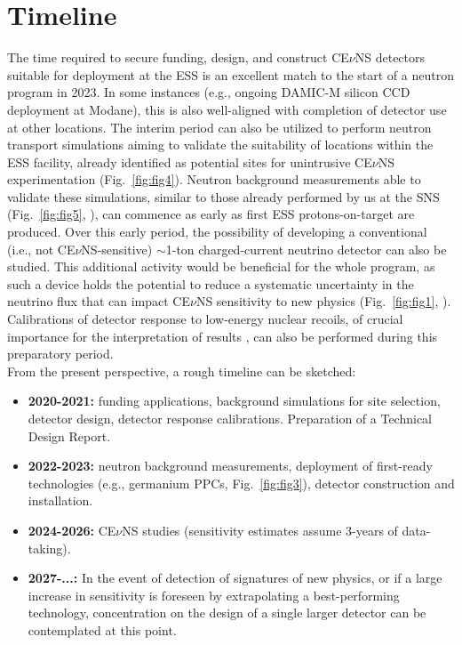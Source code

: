 \documentclass[12pt]{article}
\begin{document}
\newpage

\section{Timeline}

The time required to secure funding, design, and construct CE$\nu$NS detectors suitable for deployment at the ESS is an excellent match to the start of a neutron program in 2023. In some instances (e.g., ongoing DAMIC-M silicon CCD deployment at Modane), this is also well-aligned with  completion of detector use at other locations. The interim period can also be  utilized to perform neutron transport simulations aiming to validate the suitability of locations within the ESS facility,  already identified as potential  sites for unintrusive CE$\nu$NS experimentation (Fig.\ \ref{fig:fig4}). Neutron background measurements able to validate these simulations, similar to those already performed by us at the SNS (Fig.\ \ref{fig:fig5}, \cite{science,bjorn}), can commence as early as first ESS protons-on-target are produced. Over this early period, the possibility  of developing a conventional (i.e., not CE$\nu$NS-sensitive) $\sim$1-ton charged-current neutrino detector \cite{d2o} can also be studied. This additional activity would be beneficial for the whole program, as such a device  holds the potential to reduce a systematic uncertainty in the neutrino flux that can impact CE$\nu$NS sensitivity to new physics (Fig.\ \ref{fig:fig1}, \cite{ESS}). Calibrations of detector response to low-energy nuclear recoils, of crucial importance for the interpretation of results \cite{csiqf}, can also be performed during this preparatory period. \\

From the present perspective, a rough timeline can be sketched:


\begin{itemize}
\item {\bf 2020-2021:} funding applications, background simulations for site selection, detector design, detector response calibrations. Preparation of a Technical Design Report. 
\item {\bf 2022-2023:} neutron background measurements, deployment of first-ready technologies (e.g., germanium PPCs, Fig.\ \ref{fig:fig3}), detector construction and installation.  
\item {\bf 2024-2026:} CE$\nu$NS studies (sensitivity estimates \cite{ESS} assume 3-years of data-taking).
\item {\bf 2027-...:} In the event of detection of signatures of new physics, or if a large increase in sensitivity is foreseen by extrapolating a best-performing technology, concentration on the design of a single larger detector can be contemplated at this point.  
\end{itemize}
\end{document}
